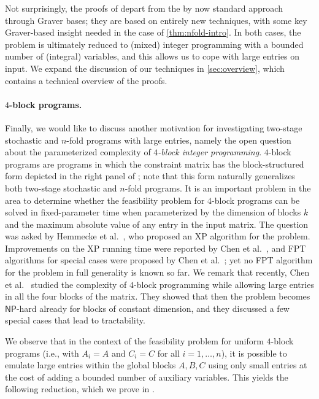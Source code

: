 \documentclass{article}
\begin{document}
Not surprisingly, the proofs of  depart from the by now standard approach through Graver bases; they are based on entirely new techniques, with some key Graver-based insight needed in the case of \cref{thm:nfold-intro}. In both cases, the problem is ultimately reduced to (mixed) integer programming with a bounded number of (integral) variables, and this allows us to cope with large entries on input. We expand the discussion of our techniques in \cref{sec:overview}, which contains a technical overview of the proofs.


\paragraph*{$4$-block programs.} Finally, we would like to discuss another motivation for investigating two-stage stochastic and $n$-fold programs with large entries, namely the open question about the parameterized complexity of {\em{$4$-block integer programming}}. $4$-block programs are programs in which the constraint matrix has the block-structured form depicted in the right panel of ; note that this form naturally generalizes both two-stage stochastic and $n$-fold programs. It is an important problem in the area to determine whether the feasibility problem for $4$-block programs can be solved in fixed-parameter time when parameterized by the dimension of blocks $k$ and the maximum absolute value of any entry in the input matrix. The question was asked by Hemmecke et al.~\cite{HemmeckeKW14}, who proposed an XP algorithm for the problem. Improvements on the XP running time were reported by Chen et al.~\cite{ChenKXS20}, and FPT algorithms for special cases were proposed by Chen et al.~\cite{ChenCZ21}; yet no FPT algorithm for the problem in full generality is known so far. We remark that recently, Chen et al.~\cite{ChenCZ22} studied the complexity of $4$-block programming while allowing large entries in all the four blocks of the matrix. They showed that then the problem becomes $\mathsf{NP}$-hard already for blocks of constant dimension, and they discussed a few special cases that lead to tractability.

We observe that in the context of the feasibility problem for uniform $4$-block programs (i.e., with $A_i=A$ and $C_i=C$ for all $i=1,\ldots,n$), it is possible to emulate large entries within the global blocks $A,B,C$ using only small entries at the cost of adding a bounded number of auxiliary variables. This yields the following reduction, which we prove in .
\end{document}
